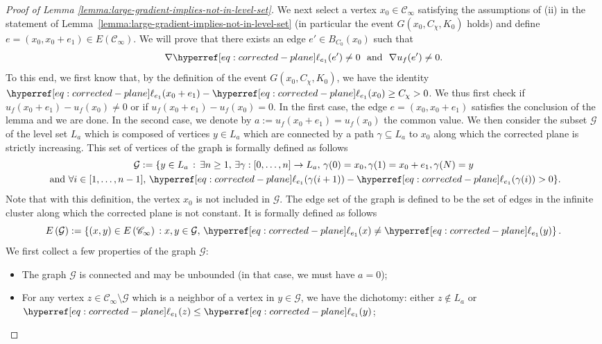\documentclass[12pt]{amsart}
\numberwithin{equation}{section}
\begin{document}
\begin{proof}[Proof of Lemma \ref{lemma:large-gradient-implies-not-in-level-set}]
		We next select a vertex $x_0 \in \mathscr{C}_\infty$ satisfying the assumptions of (ii) in the statement of Lemma~\ref{lemma:large-gradient-implies-not-in-level-set} (in particular the event $G(x_0, C_\chi,K_0)$ holds) and define $e = (x_0 , x_0 + e_1) \in E\left( \mathscr{C}_\infty \right).$ We will prove that there exists an edge $e' \in B_{C_0}(x_0)$ such that 
		\begin{equation} \label{eq:sensitivityprop}
			\nabla \ellp{e_1} (e') \neq 0 ~~\mbox{and}~~ \nabla u_f(e') \neq 0.
		\end{equation}
		To this end, we first know that, by the definition of the event $G(x_0, C_\chi,K_0)$, we have the identity $\ellp{e_1}(x_0 + e_1) - \ellp{e_1}(x_0) \geq C_\chi > 0$. We thus first check if $u_f(x_0+e_1) - u_f(x_0) \neq 0$ or if $u_f(x_0+e_1) - u_f(x_0) = 0$. In the first case, the edge $e = (x_0 ,x_0 +  e_1)$ satisfies the conclusion of the lemma and we are done. In the second case, we denote by $a := u_f(x_0+e_1) = u_f(x_0)$ the common value. We then consider the subset $\mathcal{G}$ of the level set $L_a$ which is composed of vertices $y \in L_a$ which are connected by a path $\gamma \subseteq L_a$ to $x_0$ along which the corrected plane is strictly increasing. This set of vertices of the graph is formally defined as follows
		\begin{multline*}
			\mathcal{G} := \{ y \in L_a \, : \, \exists n \geq 1, \, \exists \gamma: [ 0 , \ldots, n ] \to L_a, \, \gamma(0) = x_0, \gamma(1) = x_0+e_1, \gamma(N) = y \\ ~\mbox{and}~ \forall i \in [ 1 , \ldots, n-1], \, \ellp{e_1} (\gamma(i+1)) - \ellp{e_1} (\gamma(i)) > 0 \}.
		\end{multline*}
		Note that with this definition, the vertex $x_0$ is not included in $\mathcal{G}.$ The edge set of the graph is defined to be the set of edges in the infinite cluster along which the corrected plane is not constant. It is formally defined as follows
		\begin{equation*}
			E \left( \mathcal{G} \right) := \left\{ (x , y) \in E \left( \mathscr{C}_\infty \right) \, : x, y\in \mathcal{G}, \, \ellp{e_1}(x) \neq \ellp{e_1}(y) \right\}.
		\end{equation*}
		We first collect a few properties of the graph $\mathcal{G}$:
		\begin{itemize}
			\item The graph $\mathcal{G}$ is connected and may be unbounded (in that case, we must have $a = 0$);
			\item For any vertex $z \in \mathscr{C}_\infty \setminus \mathcal{G}$ which is a neighbor of a vertex in $y \in \mathcal{G}$, we have the dichotomy: either $z \notin L_a$ or $\ellp{e_1}(z) \leq \ellp{e_1} (y)$;

\end{itemize}
\end{proof}
\end{document}
